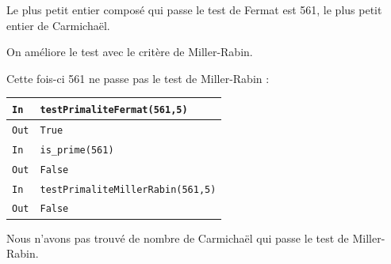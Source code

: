 \documentclass[titlepage]{article}
\begin{document}
    Le plus petit entier composé qui passe le test de Fermat est 561, le plus petit entier de Carmichaël.

    On améliore le test avec le critère de Miller-Rabin.

    

    Cette fois-ci 561 ne passe pas le test de Miller-Rabin : \bigbreak

    \begin{tabularx}{12cm}{|p{0.60cm}|X|}
        \hline
        \rowcolor{gray}
        \texttt{In}
        & 
        \texttt{testPrimaliteFermat(561,5)}
        \\
        \hline
        \texttt{Out}
        &
        \texttt{True}
        \\
        \hline
        \rowcolor{gray}
        \texttt{In}
        & 
        \texttt{is\_prime(561)}
        \\
        \hline
        \texttt{Out}
        &
        \texttt{False}
        \\
        \hline
        \rowcolor{gray}
        \texttt{In}
        & 
        \texttt{testPrimaliteMillerRabin(561,5)}
        \\
        \hline
        \texttt{Out}
        &
        \texttt{False}
        \\
        \hline
        
    \end{tabularx}
    \bigbreak

    Nous n'avons pas trouvé de nombre de Carmichaël qui passe le test de Miller-Rabin.
\end{document}

